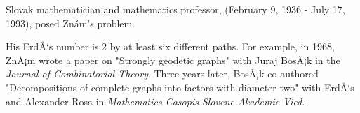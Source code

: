 \documentclass[12pt]{article}
\begin{document}
Slovak mathematician and mathematics professor, (February 9, 1936 - July 17, 1993), posed Zn\'am's problem.

His ErdÅ‘s number is 2 by at least six different paths. For example, in 1968, ZnÃ¡m wrote a paper on "Strongly geodetic graphs" with Juraj BosÃ¡k in the {\it Journal of Combinatorial Theory}. Three years later, BosÃ¡k co-authored "Decompositions of complete graphs into factors with diameter two" with ErdÅ‘s and Alexander Rosa in {\it Mathematics Casopis Slovene Akademie Vied}.
\end{document}
